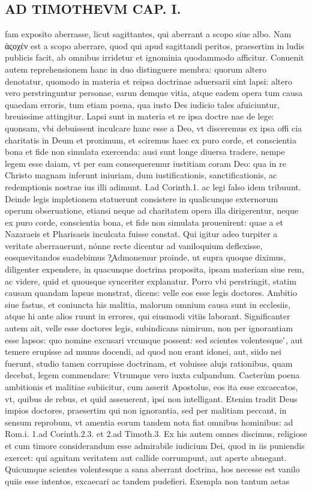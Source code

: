\documentclass{article}
\begin{document}
\begin{pages}
\section*{AD TIMOTHEVM CAP. I. }
\marginpar{[ p.24 ]}\pstart fam exposito aberrasse, licut sagittantes, qui aberrant a scopo siue albo. Nam ἀςοχέν est a scopo aberrare, quod qui apud sagittandi peritos, praesertim in ludis publicis facit, ab omnibus irridetur et ignominia quodammodo afficitur. Conuenit autem reprehensionem hanc in duo distinguere membra: quorum altero denotatur, quomodo in materia et reipsa doctrinae aduersarii sint lapsi: altero vero perstringuntur personae, earun demque  vitia, atque  eadem opera tum causa quaedam erroris, tum etiam poena, qua iusto Des iudicio tales afuiciuntur, breuissime attingitur. Lapsi sunt in materia et re ipsa doctre nae de lege: quonsam, vbi debuissent inculcare hanc esse a Deo, vt disceremus ex ipsa offi cia charitatis in Deum et proximum, et sciremus haec ex puro corde, et conscientia bona et fide non simulata exercenda: ausi sunt longe diuersa tradere, nempe legem esse daiam, vt per eam consequeremur iustitiam coram Deo: qua in re Christo magnam inferunt iniuriam, dum iustificationis, sanctificationis, ac redemptionis nostrae ius illi adimunt. I.ad Corinth.1. ac legi falso idem tribuunt. Deinde legis impletionem statuerunt consistere in qualicunque  externorum operum obseruatione, etiansi neque  ad charitatem opera illa dirigerentur, neque  ex puro corde, conscientia bona, et fide non simulata prouenirent: quae a et Nazaraeis et Pharisaeis inculcata fuisse constat. Qui igitur adeo turpiter a veritate aberrauerunt, nónne recte dicentur ad vaniloquium deflexisse, eosquevitandos suadebimus ?̧Admonemur proinde, ut supra quoque  diximus, diligenter expendere, in quacunque  doctrina proposita, ipsam materiam siue rem, ac videre, quid et quousque  synceriter explanatur. Porro vbi perstringit, statim causam quandam lapsus monstrat, dicens: velle eos esse legis doctores. Ambitio siue fastus, et coniuncta his malitia, malorum omnium causa sunt in ecclesiis, atque  hi ante alios ruunt in errores, qui eiusmodi vitiis laborant. Significanter autem ait, velle esse doctores legis, subindicans nimirum, non per ignorantiam esse lapsos: quo nomine excusari vrcunque  possent: sed scientes volentesque ́, aut temere erupisse ad munus docendi, ad quod non erant idonei, aut, siido nei fuerunt, studio tamen corrupisse doctrinam, et voluisse alujs rationibus, quam decebat, legem commendare: Vtrumque  vero iuxta culpandum. Caeterùm poena ambitionis et malitiae subiicitur, cum asserit Apostolus, eos ita esse excaecatos, vt, quibus de rebus, et quid asseuerent, ipsi non intelligant. Etenim tradit Deus impios doctores, praesertim qui non ignorantia, sed per malitiam peccant, in sensum reprobum, vt amentia eorum tandem nota fiat omnibus hominibus: ad Rom.i. 1.ad Corinth.2.3. et 2.ad Timoth.3. Ex his autem omnes discimus, religiose et cum timore considerandum esse admirabile iudicium Dei, quod in iis puniendis exercet: qui agnitam veritatem aut callide corrumpunt, aut aperte abnegant. Quicumque  scientes volentesque  a sana aberrant doctrina, hos necesse est vanilo quiis esse intentos, excaecari ac tandem pudefieri. Exempla non tantum aetas 
\end{pages}
\end{document}
